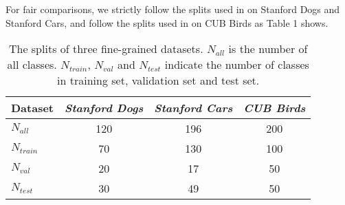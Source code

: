 \documentclass[final]{cvpr}
\begin{document}
	For fair comparisons, we strictly follow the splits used in \cite{li2019revisiting, li2019distribution} on Stanford Dogs and Stanford Cars, and follow the splits used in \cite{chen2019closer} on CUB Birds as Table 1 shows.
	\begin{table}[t]
		\centering
		\begin{tabular}{p{0.9cm}<{\centering}ccc}
			\toprule
			\textbf{Dataset} & \emph{\textbf{Stanford Dogs}}&\emph{\textbf{Stanford Cars}}&\emph{\textbf{CUB Birds}}
			\\
			\midrule
			$N_{all}$&120&196&200\\
			$N_{train}$&70&130&100\\
			$N_{val}$&20&17&50\\
			$N_{test}$&30&49&50\\
			\bottomrule
		\end{tabular}
		\caption{The splits of three fine-grained datasets. $N_{all}$ is the number of all classes. $N_{train}$, $N_{val}$ and $N_{test}$ indicate the number of classes in training set, validation set and test set.}
	\end{table}
	
\end{document}
